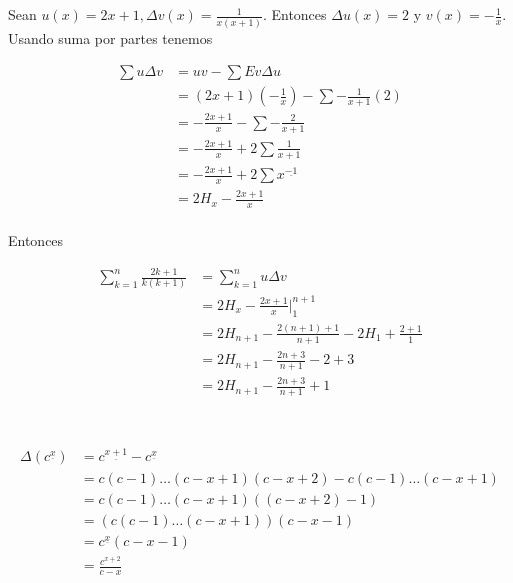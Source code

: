 \documentclass{article}
\begin{document}
\subsection{} %

Sean $u(x) = 2x+1, \Delta v(x) = \frac{1}{x(x+1)}$. Entonces $\Delta u(x) = 2$
y $v(x) = -\frac{1}{x}$. Usando suma por partes tenemos


\begin{align*}
\sum u \Delta v & = uv - \sum Ev \Delta u \\
 & = (2x+1)(-\frac{1}{x}) - \sum -\frac{1}{x+1}(2) \\
 & = -\frac{2x+1}{x} - \sum -\frac{2}{x+1} \\
 & = -\frac{2x+1}{x} + 2\sum \frac{1}{x+1} \\
 & = -\frac{2x+1}{x} + 2\sum x^{\underline{-1}} \\
 & = 2H_x - \frac{2x+1}{x} \\
\end{align*}

Entonces

\begin{align*}
\sum_{k=1}^n \frac{2k+1}{k(k+1)} & = \sum_{k=1}^n u \Delta v \\
             & = 2H_x -\frac{2x+1}{x} \Big |_{1}^{n+1} \\
             & = 2H_{n+1} -\frac{2(n+1)+1}{n+1} - 2H_1 + \frac{2+1}{1} \\
             & = 2H_{n+1} -\frac{2n+3}{n+1} - 2 + 3 \\
             & = 2H_{n+1} -\frac{2n+3}{n+1} + 1 \\
\end{align*}

\section{} %

\begin{align*}
\Delta(c^{\underline{x}}) & = c^{\underline{x+1}} - c^{\underline{x}} \\
  & = c(c-1) \ldots (c-x+1)(c-x+2) - c(c-1) \ldots (c-x+1) \\
  & = c(c-1) \ldots (c-x+1)((c-x+2)-1) \\
  & = (c(c-1) \ldots (c-x+1))(c-x-1) \\
  & = c^{\underline{x}}(c-x-1) \\
  & = \frac{c^{\underline{x+2}}}{c-x} \\
\end{align*}
\end{document}
